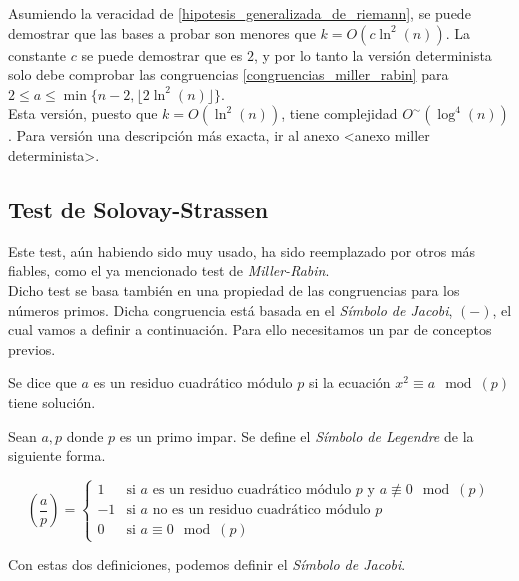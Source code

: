 Asumiendo la veracidad de \autoref{hipotesis_generalizada_de_riemann}, se puede demostrar que las bases a probar son menores que $k = O(c\ln^2(n))$. La constante $c$ se puede demostrar que es $2$, y por lo tanto la versión determinista solo debe comprobar las congruencias \eqref{congruencias_miller_rabin} para $2 \leq a \leq \min\{n-2, \lfloor 2\ln^2(n) \rfloor\}$.\\

Esta versión, puesto que $k = O(\ln^2(n))$, tiene complejidad $O^\sim(\log^4(n))$. Para versión una descripción más exacta, ir al anexo <anexo miller determinista>.

\subsection{Test de Solovay-Strassen}

Este test, aún habiendo sido muy usado, ha sido reemplazado por otros más fiables, como el ya mencionado test de \textit{Miller-Rabin}.\\

Dicho test se basa también en una propiedad de las congruencias para los números primos. Dicha congruencia está basada en el \textit{Símbolo de Jacobi}, $(-)$, el cual vamos a definir a continuación. Para ello necesitamos un par de conceptos previos.

\begin{definicion}
	Se dice que $a$ es un residuo cuadrático módulo $p$ si la ecuación $x^2 \equiv a \mod(p)$ tiene solución.
\end{definicion}

\begin{definicion}\label{simbolo_de_legendre}
	Sean $a, p$ donde $p$ es un primo impar. Se define el \textit{Símbolo de Legendre} de la siguiente forma.
	
	\begin{equation}
	\left(\frac{a}{p}\right) =
	\begin{cases}
		1 &\text{si $a$ es un residuo cuadrático módulo $p$ y $a \not\equiv 0 \mod(p)$}\\
		-1 &\text{si $a$ no es un residuo cuadrático módulo $p$}\\
		0 &\text{si $a \equiv 0 \mod(p)$}
	\end{cases}
	\end{equation}
\end{definicion}

Con estas dos definiciones, podemos definir el \textit{Símbolo de Jacobi}.

